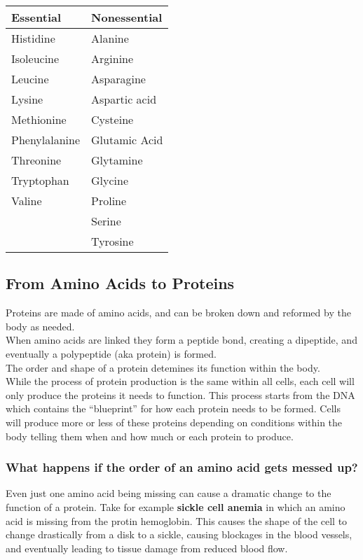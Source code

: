 \documentclass[letterpaper, 11pt]{article}
\begin{document}
\begin{center}
\begin{tabular}{ll}
Essential & Nonessential\\
\hline
Histidine & Alanine\\
Isoleucine & Arginine\\
Leucine & Asparagine\\
Lysine & Aspartic acid\\
Methionine & Cysteine\\
Phenylalanine & Glutamic Acid\\
Threonine & Glytamine\\
Tryptophan & Glycine\\
Valine & Proline\\
 & Serine\\
 & Tyrosine\\
\end{tabular}
\end{center}
\subsection{From Amino Acids to Proteins}
\label{sec:org6e1b3f6}
Proteins are made of amino acids, and can be broken down and reformed by the body as needed.\\
When amino acids are linked they form a peptide bond, creating a dipeptide, and eventually a polypeptide (aka protein) is formed.\\
The order and shape of a protein detemines its function within the body.\\
While the process of protein production is the same within all cells, each cell will only produce the proteins it needs to function. This process starts from the DNA which contains the ``blueprint'' for how each protein needs to be formed. Cells will produce more or less of these proteins depending on conditions within the body telling them when and how much or each protein to produce.\\
\subsubsection{What happens if the order of an amino acid gets messed up?}
\label{sec:org50e1a7c}
Even just one amino acid being missing can cause a dramatic change to the function of a protein. Take for example \textbf{sickle cell anemia} in which an amino acid is missing from the protin hemoglobin. This causes the shape of the cell to change drastically from a disk to a sickle, causing blockages in the blood vessels, and eventually leading to tissue damage from reduced blood flow.\\
\end{document}

